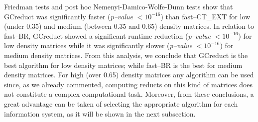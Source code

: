 \documentclass[authoryear,preprint,review,12pt]{elsarticle}
\begin{document}
	Friedman tests and post hoc Nemenyi-Damico-Wolfe-Dunn tests show that GCreduct was significantly faster (\textit{p--value} $< 10^{-16}$) than fast--CT\_EXT for low (under 0.35) and medium (between 0.35 and 0.65) density matrices. 
	In relation to fast--BR, GCreduct showed a significant runtime reduction (\textit{p--value} $< 10^{-16}$) for low density matrices while it was significantly slower (\textit{p--value} $< 10^{-16}$) for medium density matrices. 
	From this analysis, we conclude that GCreduct is the best algorithm for low density matrices; while fast--BR is the best for medium density matrices. For high (over 0.65) density matrices any algorithm can be used since, as we already commented, computing reducts on this kind of matrices does not constitute a complex computational task. Moreover, from these conclusions, a great advantage can be taken of selecting the appropriate algorithm for each information system, as it will be shown in the next subsection. 
		
\end{document}
